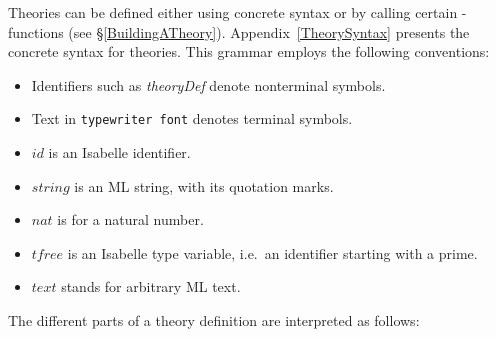 Theories can be defined either using concrete syntax or by calling certain
\ML-functions (see \S\ref{BuildingATheory}).  Appendix~\ref{TheorySyntax}
presents the concrete syntax for theories.
This grammar employs the
following conventions: 
\begin{itemize}
\item Identifiers such as {\it theoryDef} denote nonterminal symbols.
\item Text in {\tt typewriter font} denotes terminal symbols.
\item $id$ is an Isabelle identifier.
\item $string$ is an ML string, with its quotation marks.
\item $nat$ is for a natural number.
\item $tfree$ is an Isabelle type variable, i.e.\ an identifier starting with
  a prime.
\item $text$ stands for arbitrary ML text.
\end{itemize}
The different parts of a theory definition are interpreted as follows:
